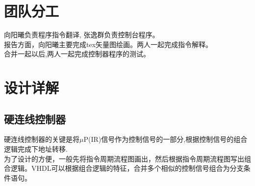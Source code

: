 \documentclass[UTF8]{ctexart}
\begin{document}
\section{团队分工}
向阳曦负责程序指令翻译, 张逸群负责控制台程序。\\
报告方面，向阳曦主要完成tex矢量图绘画。两人一起完成指令解释。\\
\indent 合并一起以后,两人一起完成控制器程序的测试。
\section{设计详解}
\subsection{硬连线控制器}
硬连线控制器的关键是将$\mu \text{P}$(IR)信号作为控制信号的一部分,根据控制信号的组合逻辑完成下地址转移.\\
\indent 为了设计的方便，一般先将指令周期流程图画出，然后根据指令周期流程图写出组合逻辑。VHDL可以根据组合逻辑的特征，合并多个相似的控制信号组合为分支条件语句。
\end{document}
